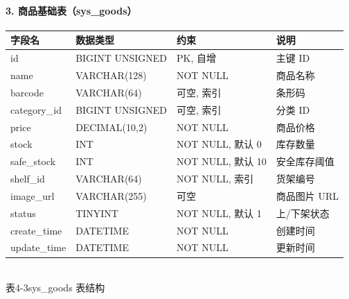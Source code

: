 \paragraph{3. 商品基础表（sys\_goods）}
\begin{center}
  \renewcommand{\arraystretch}{1.4}
  \begin{tabular}{|>{\centering\arraybackslash}m{2.5cm}|>{\centering\arraybackslash}m{3.2cm}|>{\centering\arraybackslash}m{4.4cm}|>{\centering\arraybackslash}m{3.5cm}|}
    \hline
    \textbf{字段名} & \textbf{数据类型}   & \textbf{约束}     & \textbf{说明} \\ \hline
    id           & BIGINT UNSIGNED & PK, 自增          & 主键 ID       \\ \hline
    name         & VARCHAR(128)    & NOT NULL        & 商品名称        \\ \hline
    barcode      & VARCHAR(64)     & 可空, 索引          & 条形码         \\ \hline
    category\_id & BIGINT UNSIGNED & 可空, 索引          & 分类 ID       \\ \hline
    price        & DECIMAL(10,2)   & NOT NULL        & 商品价格        \\ \hline
    stock        & INT             & NOT NULL, 默认 0  & 库存数量        \\ \hline
    safe\_stock  & INT             & NOT NULL, 默认 10 & 安全库存阈值      \\ \hline
    shelf\_id    & VARCHAR(64)     & NOT NULL, 索引    & 货架编号        \\ \hline
    image\_url   & VARCHAR(255)    & 可空              & 商品图片 URL    \\ \hline
    status       & TINYINT         & NOT NULL, 默认 1  & 上/下架状态      \\ \hline
    create\_time & DATETIME        & NOT NULL        & 创建时间        \\ \hline
    update\_time & DATETIME        & NOT NULL        & 更新时间        \\ \hline
  \end{tabular}
  \\[0.3em]
  {表4-3\quad sys\_goods 表结构}
\end{center}

